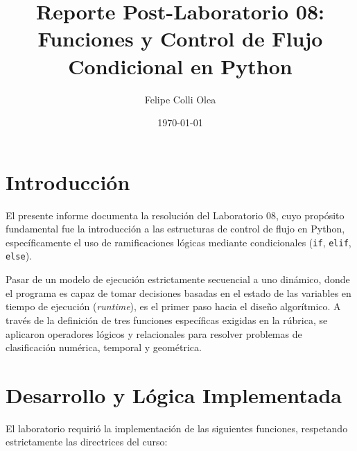 \documentclass[11pt]{article}
\title{Reporte Post-Laboratorio 08: \\ \large{Funciones y Control de Flujo Condicional en Python}}
\author{Felipe Colli Olea}
\date{\today}
\begin{document}
\maketitle
\thispagestyle{fancy}

\section{Introducción}

El presente informe documenta la resolución del Laboratorio 08, cuyo propósito fundamental fue la introducción a las estructuras de control de flujo en Python, específicamente el uso de ramificaciones lógicas mediante condicionales (\texttt{if}, \texttt{elif}, \texttt{else}).

Pasar de un modelo de ejecución estrictamente secuencial a uno dinámico, donde el programa es capaz de tomar decisiones basadas en el estado de las variables en tiempo de ejecución (\textit{runtime}), es el primer paso hacia el diseño algorítmico. A través de la definición de tres funciones específicas exigidas en la rúbrica, se aplicaron operadores lógicos y relacionales para resolver problemas de clasificación numérica, temporal y geométrica.

\section{Desarrollo y Lógica Implementada}

El laboratorio requirió la implementación de las siguientes funciones, respetando estrictamente las directrices del curso:
\end{document}
